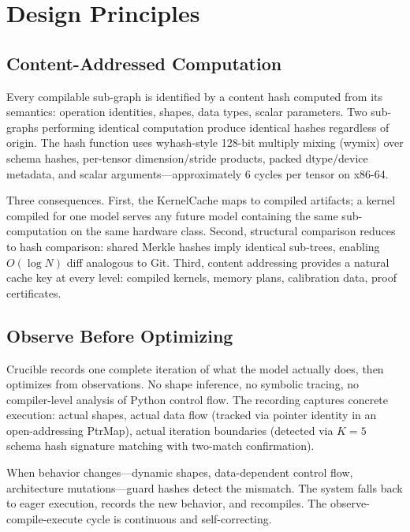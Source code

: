 
\section{Design Principles}\label{sec:principles}

\subsection{Content-Addressed Computation}

Every compilable sub-graph is identified by a content hash computed from its semantics: operation identities, shapes, data types, scalar parameters.
Two sub-graphs performing identical computation produce identical hashes regardless of origin.
The hash function uses wyhash-style 128-bit multiply mixing (wymix) over schema hashes, per-tensor dimension/stride products, packed dtype/device metadata, and scalar arguments---approximately 6 cycles per tensor on x86-64.

Three consequences.
First, the KernelCache maps  to compiled artifacts; a kernel compiled for one model serves any future model containing the same sub-computation on the same hardware class.
Second, structural comparison reduces to hash comparison: shared Merkle hashes imply identical sub-trees, enabling $O(\log N)$ diff analogous to Git.
Third, content addressing provides a natural cache key at every level: compiled kernels, memory plans, calibration data, proof certificates.

\subsection{Observe Before Optimizing}

Crucible records one complete iteration of what the model actually does, then optimizes from observations.
No shape inference, no symbolic tracing, no compiler-level analysis of Python control flow.
The recording captures concrete execution: actual shapes, actual data flow (tracked via pointer identity in an open-addressing PtrMap), actual iteration boundaries (detected via $K{=}5$ schema hash signature matching with two-match confirmation).

When behavior changes---dynamic shapes, data-dependent control flow, architecture mutations---guard hashes detect the mismatch.
The system falls back to eager execution, records the new behavior, and recompiles.
The observe-compile-execute cycle is continuous and self-correcting.

